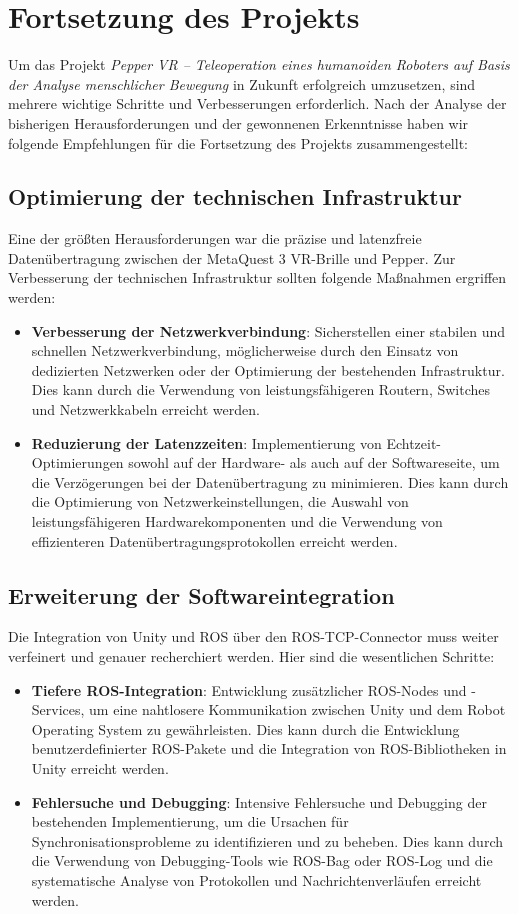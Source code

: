 \chapter{Fortsetzung des Projekts}
Um das Projekt \textit{Pepper VR – Teleoperation eines humanoiden Roboters auf Basis der Analyse menschlicher Bewegung} in Zukunft erfolgreich umzusetzen, sind mehrere wichtige Schritte und Verbesserungen erforderlich. Nach der Analyse der bisherigen Herausforderungen und der gewonnenen Erkenntnisse haben wir folgende Empfehlungen für die Fortsetzung des Projekts zusammengestellt:

\section{Optimierung der technischen Infrastruktur}
Eine der größten Herausforderungen war die präzise und latenzfreie Datenübertragung zwischen der MetaQuest 3 VR-Brille und Pepper. Zur Verbesserung der technischen Infrastruktur sollten folgende Maßnahmen ergriffen werden:
\begin{itemize}
    \item \textbf{Verbesserung der Netzwerkverbindung}: Sicherstellen einer stabilen und schnellen Netzwerkverbindung, möglicherweise durch den Einsatz von dedizierten Netzwerken oder der Optimierung der bestehenden Infrastruktur. Dies kann durch die Verwendung von leistungsfähigeren Routern, Switches und Netzwerkkabeln erreicht werden.
    \item \textbf{Reduzierung der Latenzzeiten}: Implementierung von Echtzeit-Optimierungen sowohl auf der Hardware- als auch auf der Softwareseite, um die Verzögerungen bei der Datenübertragung zu minimieren. Dies kann durch die Optimierung von Netzwerkeinstellungen, die Auswahl von leistungsfähigeren Hardwarekomponenten und die Verwendung von effizienteren Datenübertragungsprotokollen erreicht werden.
\end{itemize}

\section{Erweiterung der Softwareintegration}
Die Integration von Unity und ROS über den ROS-TCP-Connector muss weiter verfeinert und genauer recherchiert werden. Hier sind die wesentlichen Schritte:
\begin{itemize}
    \item \textbf{Tiefere ROS-Integration}: Entwicklung zusätzlicher ROS-Nodes und -Services, um eine nahtlosere Kommunikation zwischen Unity und dem Robot Operating System zu gewährleisten. Dies kann durch die Entwicklung benutzerdefinierter ROS-Pakete und die Integration von ROS-Bibliotheken in Unity erreicht werden.
    \item \textbf{Fehlersuche und Debugging}: Intensive Fehlersuche und Debugging der bestehenden Implementierung, um die Ursachen für Synchronisationsprobleme zu identifizieren und zu beheben. Dies kann durch die Verwendung von Debugging-Tools wie ROS-Bag oder ROS-Log und die systematische Analyse von Protokollen und Nachrichtenverläufen erreicht werden.
\end{itemize}

